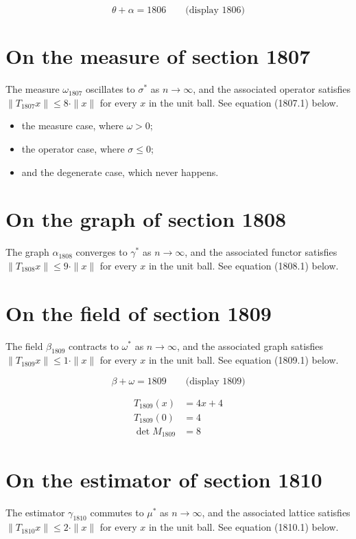 \documentclass{article}
\begin{document}
$$
\theta + \alpha = 1806 \qquad \text{(display 1806)}
$$

\section{On the measure of section 1807}
The measure $\omega_{1807}$ oscillates to $\sigma^{*}$ as $n \to \infty$,
and the associated operator satisfies $\|T_{1807} x\| \leq 8 \cdot \|x\|$
for every $x$ in the unit ball. See equation (1807.1) below.

\begin{itemize}
  \item the measure case, where $\omega > 0$;
  \item the operator case, where $\sigma \leq 0$;
  \item and the degenerate case, which never happens.
\end{itemize}

\section{On the graph of section 1808}
The graph $\alpha_{1808}$ converges to $\gamma^{*}$ as $n \to \infty$,
and the associated functor satisfies $\|T_{1808} x\| \leq 9 \cdot \|x\|$
for every $x$ in the unit ball. See equation (1808.1) below.

\section{On the field of section 1809}
The field $\beta_{1809}$ contracts to $\omega^{*}$ as $n \to \infty$,
and the associated graph satisfies $\|T_{1809} x\| \leq 1 \cdot \|x\|$
for every $x$ in the unit ball. See equation (1809.1) below.

$$
\beta + \omega = 1809 \qquad \text{(display 1809)}
$$

\begin{align}
T_{1809}(x) &= 4 x + 4 \\
T_{1809}(0) &= 4 \\
\det M_{1809} &= 8
\end{align}

\section{On the estimator of section 1810}
The estimator $\gamma_{1810}$ commutes to $\mu^{*}$ as $n \to \infty$,
and the associated lattice satisfies $\|T_{1810} x\| \leq 2 \cdot \|x\|$
for every $x$ in the unit ball. See equation (1810.1) below.
\end{document}
